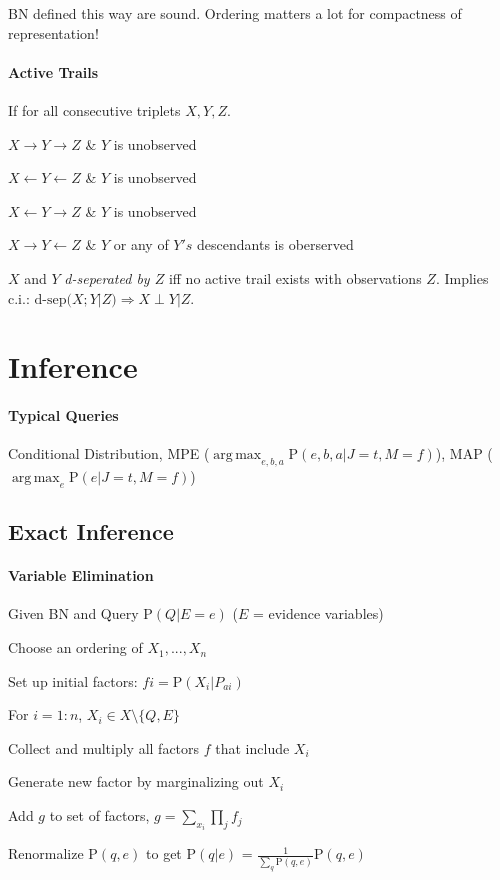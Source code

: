 \documentclass[a4paper, 10pt]{scrartcl}
\DeclareMathOperator*{\argmax}{arg\,max}
\newcommand{\uP}{\mathrm P}
\begin{document}
\begin{multicols*}{3}
		BN defined this way are sound. Ordering matters a lot for compactness of representation!
		
		\paragraph{Active Trails} If for all consecutive triplets $X, Y, Z$.
		\begin{compactitem}
			\item  $X \rightarrow  Y \rightarrow Z$ \& $Y$ is unobserved
			\item  $X \leftarrow  Y \leftarrow Z$ \& $Y$ is unobserved
			\item  $X \leftarrow  Y \rightarrow Z$ \& $Y$ is unobserved
			\item  $X \rightarrow  Y \leftarrow Z$ \& $Y$ or any of $Y's$ descendants is oberserved
		\end{compactitem}
	
		$X$ and $Y$ \emph{d-seperated by $Z$} iff no active trail exists with observations $Z$.
		Implies c.i.: $\text{d-sep}(X;Y | Z) \Rightarrow X \perp Y | Z$.
		
		\section{Inference}
		\paragraph{Typical Queries} Conditional Distribution, MPE ($\argmax_{e,b,a} \uP(e,b,a | J=t, M = f)$), MAP ($\argmax_{e} \uP(e | J=t, M = f)$)
		
		\subsection{Exact Inference}
		
		\paragraph{Variable Elimination}
		\begin{compactitem}
		\item Given BN and Query $\uP(Q | E=e)$ ($E$ = evidence variables)
		\item Choose an ordering of $X_1, ..., X_n$
		\item Set up initial factors: $fi = \uP(X_i | P_{ai})$
		\item For $i =1:n$, $X_i  \in X\setminus \{Q,E\}$
		\begin{compactenum}
			\item Collect and multiply all factors $f$ that include $X_i$  
			\item Generate new factor by marginalizing out $X_i$
			\item Add $g$ to set of factors, $g = \sum_{x_i}\prod_{j}f_j$
		\end{compactenum}
		\item  Renormalize $\uP(q,e)$ to get $\uP(q | e)$ = $\frac{1}{\sum_{q}\uP(q,e)}\uP(q,e)$
		

\end{compactitem}
\end{multicols*}
\end{document}

